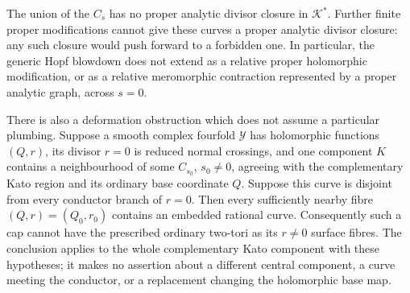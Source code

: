 \begin{proposition}
The union of the $C_s$ has no proper analytic divisor
closure in $\mathcal K^*$. Further finite proper modifications
cannot give these curves a proper analytic divisor closure:
any such closure would push forward to a forbidden one.
In particular, the generic Hopf blowdown does not extend
as a relative proper holomorphic modification, or as a
relative meromorphic contraction represented by a proper
analytic graph, across $s=0$.

There is also a deformation obstruction which does not
assume a particular plumbing. Suppose a smooth complex
fourfold $\mathcal Y$ has holomorphic functions $(Q,r)$,
its divisor $r=0$ is reduced normal crossings, and one
component $K$ contains a neighbourhood of some $C_{s_0}$,
$s_0\ne0$, agreeing with the complementary Kato region
and its ordinary base coordinate $Q$. Suppose this curve
is disjoint from every conductor branch of $r=0$.
Then every sufficiently nearby fibre $(Q,r)=(Q_0,r_0)$
contains an embedded rational curve. Consequently such a
cap cannot have the prescribed ordinary two-tori as its
$r\ne0$ surface fibres. The conclusion applies to the
whole complementary Kato component with these hypotheses;
it makes no assertion about a different central component,
a curve meeting the conductor, or a replacement changing
the holomorphic base map.
\end{proposition}


